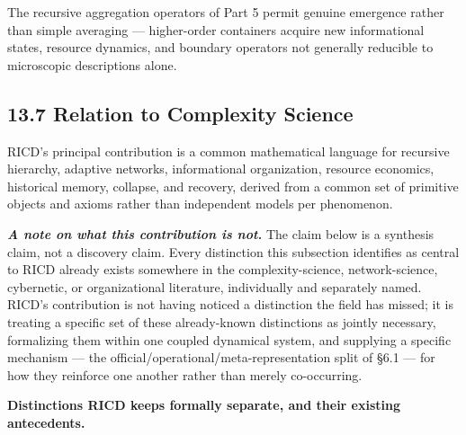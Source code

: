 \documentclass[
]{article}
\begin{document}
The recursive aggregation operators of Part 5 permit genuine emergence
rather than simple averaging --- higher-order containers acquire new
informational states, resource dynamics, and boundary operators not
generally reducible to microscopic descriptions alone.

\hypertarget{relation-to-complexity-science}{%
\subsection{13.7 Relation to Complexity
Science}\label{relation-to-complexity-science}}

RICD's principal contribution is a common mathematical language for
recursive hierarchy, adaptive networks, informational organization,
resource economics, historical memory, collapse, and recovery, derived
from a common set of primitive objects and axioms rather than
independent models per phenomenon.

\emph{\textbf{A note on what this contribution is not.}} The claim below
is a synthesis claim, not a discovery claim. Every distinction this
subsection identifies as central to RICD already exists somewhere in the
complexity-science, network-science, cybernetic, or organizational
literature, individually and separately named. RICD's contribution is
not having noticed a distinction the field has missed; it is treating a
specific set of these already-known distinctions as jointly necessary,
formalizing them within one coupled dynamical system, and supplying a
specific mechanism --- the official/operational/meta-representation
split of §6.1 --- for how they reinforce one another rather than merely
co-occurring.

\textbf{Distinctions RICD keeps formally separate, and their existing
antecedents.}
\end{document}

